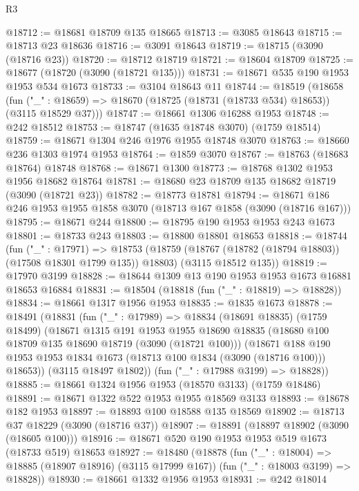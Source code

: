 \begin{lexlean}{R3}
\begin{coremodule}
@18712 := @18681 @18709 @135 @18665
@18713 := @3085 @18643
@18715 := @18713 @23 @18636
@18716 := @3091 @18643
@18719 := @18715 (@3090 (@18716 @23))
@18720 := @18712 @18719
@18721 := @18604 @18709
@18725 := @18677 (@18720 (@3090 (@18721 @135)))
@18731 := @18671 @535 @190 @1953 @1953 @534 @1673
@18733 := @3104 @18643 @11
@18744 := @18519
    (@18658
      (fun ("_" : @18659) => @18670 (@18725 (@18731 (@18733 @534) @18653)) (@3115 @18529 @37)))
@18747 := @18661 @1306 @16288 @1953
@18748 := @242 @18512
@18753 := @18747 (@1635 @18748 @3070) (@1759 @18514)
@18759 := @18671 @1304 @246 @1976 @1955 @18748 @3070
@18763 := @18660 @236 @1303 @1974 @1953
@18764 := @1859 @3070
@18767 := @18763 (@18683 @18764) @18748
@18768 := @18671 @1300
@18773 := @18768 @1302 @1953 @1956 @18682 @18764
@18781 := @18680 @23 @18709 @135 @18682 @18719 (@3090 (@18721 @23))
@18782 := @18773 @18781
@18794 := @18671 @186 @246 @1953 @1955 @1858 @3070 (@18713 @167 @1858 (@3090 (@18716 @167)))
@18795 := @18671 @244
@18800 := @18795 @190 @1953 @1953 @243 @1673
@18801 := @18733 @243
@18803 := @18800 @18801 @18653
@18818 := @18744
    (fun ("_" : @17971) =>
    @18753
      (@18759 (@18767 (@18782 (@18794 @18803)) (@17508 @18301 @1799 @135)) @18803)
      (@3115 @18512 @135))
@18819 := @17970 @3199
@18828 := @18644 @1309 @13 @190 @1953 @1953 @1673 @16881 @18653 @16884
@18831 := @18504 (@18818 (fun ("_" : @18819) => @18828))
@18834 := @18661 @1317 @1956 @1953
@18835 := @1835 @1673
@18878 := @18491
    (@18831
      (fun ("_" : @17989) =>
      @18834
        (@18691 @18835)
        (@1759 @18499)
        (@18671
          @1315
          @191
          @1953
          @1955
          @18690
          @18835
          (@18680 @100 @18709 @135 @18690 @18719 (@3090 (@18721 @100)))
          (@18671
            @188
            @190
            @1953
            @1953
            @1834
            @1673
            (@18713 @100 @1834 (@3090 (@18716 @100)))
            @18653))
        (@3115 @18497 @1802))
      (fun ("_" : @17988 @3199) => @18828))
@18885 := @18661 @1324 @1956 @1953 (@18570 @3133) (@1759 @18486)
@18891 := @18671 @1322 @522 @1953 @1955 @18569 @3133
@18893 := @18678 @182 @1953
@18897 := @18893 @100 @18588 @135 @18569
@18902 := @18713 @37 @18229 (@3090 (@18716 @37))
@18907 := @18891 (@18897 @18902 (@3090 (@18605 @100)))
@18916 := @18671 @520 @190 @1953 @1953 @519 @1673 (@18733 @519) @18653
@18927 := @18480
    (@18878
      (fun ("_" : @18004) => @18885 (@18907 @18916) (@3115 @17999 @167))
      (fun ("_" : @18003 @3199) => @18828))
@18930 := @18661 @1332 @1956 @1953
@18931 := @242 @18014

\end{coremodule}
\end{lexlean}
